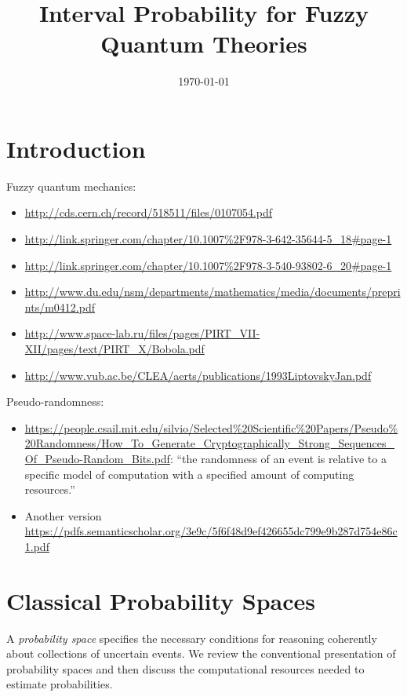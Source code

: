 \documentclass{article}
\theoremstyle{remark}
\begin{document}
\title{Interval Probability for Fuzzy Quantum Theories}
\author{}
\date{\today}
\maketitle

\section{Introduction}
  
Fuzzy quantum mechanics:
\begin{itemize}
\item \url{http://cds.cern.ch/record/518511/files/0107054.pdf}
\item \url{http://link.springer.com/chapter/10.1007%2F978-3-642-35644-5_18#page-1}
\item \url{http://link.springer.com/chapter/10.1007%2F978-3-540-93802-6_20#page-1}
\item \url{http://www.du.edu/nsm/departments/mathematics/media/documents/preprints/m0412.pdf}
\item \url{http://www.space-lab.ru/files/pages/PIRT_VII-XII/pages/text/PIRT_X/Bobola.pdf}
\item \url{http://www.vub.ac.be/CLEA/aerts/publications/1993LiptovskyJan.pdf}
\end{itemize}

\noindent Pseudo-randomness:
\begin{itemize}
\item
  \url{https://people.csail.mit.edu/silvio/Selected%20Scientific%20Papers/Pseudo%20Randomness/How_To_Generate_Cryptographically_Strong_Sequences_Of_Pseudo-Random_Bits.pdf}:
  ``the randomness of an event is relative to a specific model of
  computation with a specified amount of computing resources.''
\item Another version \url{https://pdfs.semanticscholar.org/3e9c/5f6f48d9ef426655dc799e9b287d754e86c1.pdf}
\end{itemize}

\section{Classical Probability Spaces}
  
A \emph{probability space} specifies the necessary conditions for
reasoning coherently about collections of uncertain events.  We review
the conventional presentation of probability spaces and then discuss
the computational resources needed to estimate probabilities.
\end{document}
